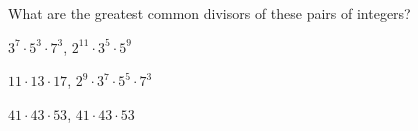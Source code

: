 
%
%
%

	What are the greatest common divisors of these pairs of integers?
	\begin{subproblem}
		\item $3^7 \cdot 5^3 \cdot 7^3$, $2^{11} \cdot 3^5 \cdot 5^9$
		\item $11 \cdot 13 \cdot 17$, $2^9 \cdot 3^7 \cdot 5^5 \cdot 7^3$
		\skipitem
		\item $41 \cdot 43 \cdot 53$, $41 \cdot 43 \cdot 53$
	\end{subproblem}

\solution
	\begin{subproblem}
		\item 
		\item 
		\skipitem
		\item 
	\end{subproblem}
